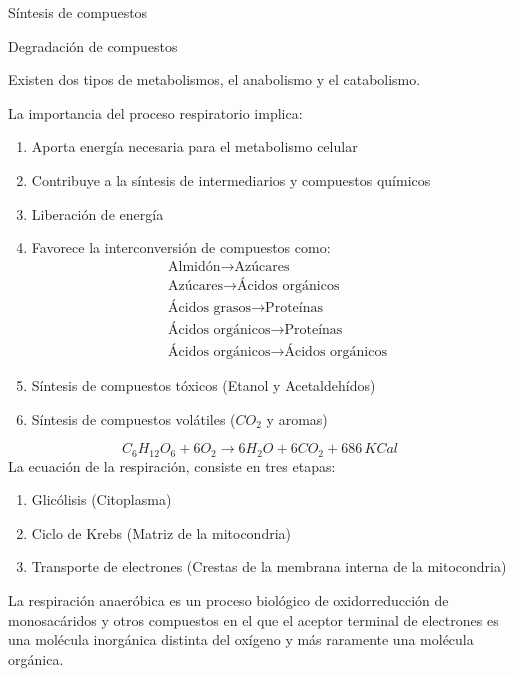 \begin{definition}[Anabolismo]
    Síntesis de compuestos
\end{definition}
\begin{definition}[Catabolismo]
    Degradación de compuestos
\end{definition}
Existen dos tipos de metabolismos, el anabolismo y el catabolismo.

La importancia del proceso respiratorio implica: 
\begin{enumerate}
    \item Aporta energía necesaria para el metabolismo celular
    \item Contribuye a la síntesis de intermediarios y compuestos químicos
    \item Liberación de energía
    \item Favorece la interconversión de compuestos como: \begin{align*}
        &\text{Almidón}\longrightarrow \text{Azúcares}\\
        &\text{Azúcares}\longrightarrow \text{Ácidos orgánicos}\\
        &\text{Ácidos grasos} \longrightarrow \text{Proteínas}\\
        &\text{Ácidos orgánicos}\longrightarrow \text{Proteínas}\\
        &\text{Ácidos orgánicos}\longrightarrow \text{Ácidos orgánicos}
    \end{align*}
    \item Síntesis de compuestos tóxicos (Etanol y Acetaldehídos)
    \item Síntesis de compuestos volátiles ($CO_2$ y aromas)
\end{enumerate}

\begin{equation}
    C_6H_{12}O_6+6O_2\longrightarrow 6H_2O+6CO_2+686\,KCal
\end{equation}
La ecuación de la respiración, consiste en tres etapas:
\begin{enumerate}
    \item Glicólisis (Citoplasma)
    \item Ciclo de Krebs (Matriz de la mitocondria)
    \item Transporte de electrones (Crestas de la membrana interna de la mitocondria)
\end{enumerate}

La respiración anaeróbica es un proceso biológico de oxidorreducción de monosacáridos y otros compuestos en el que el aceptor terminal de electrones es una molécula inorgánica distinta del oxígeno y más raramente una molécula orgánica.

